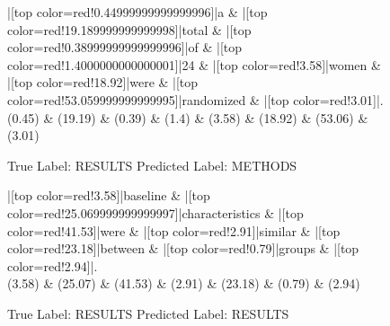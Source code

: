 \documentclass[a4paper, landscape]{article}
\begin{document}
\begin{figure}
\begin{center}
\begin{dependency}
\begin{deptext}
|[top color=red!0.44999999999999996]|a \& |[top color=red!19.189999999999998]|total \& |[top color=red!0.38999999999999996]|of \& |[top color=red!1.4000000000000001]|24 \& |[top color=red!3.58]|women \& |[top color=red!18.92]|were \& |[top color=red!53.059999999999995]|randomized \& |[top color=red!3.01]|.\\
(0.45) \& (19.19) \& (0.39) \& (1.4) \& (3.58) \& (18.92) \& (53.06) \& (3.01)\\
\end{deptext}
\end{dependency}
\end{center}
\caption{True Label: RESULTS Predicted Label: METHODS}
\end{figure}
\clearpage
\begin{figure}
\begin{center}
\begin{dependency}
\begin{deptext}
|[top color=red!3.58]|baseline \& |[top color=red!25.069999999999997]|characteristics \& |[top color=red!41.53]|were \& |[top color=red!2.91]|similar \& |[top color=red!23.18]|between \& |[top color=red!0.79]|groups \& |[top color=red!2.94]|.\\
(3.58) \& (25.07) \& (41.53) \& (2.91) \& (23.18) \& (0.79) \& (2.94)\\
\end{deptext}
\end{dependency}
\end{center}
\caption{True Label: RESULTS Predicted Label: RESULTS}
\end{figure}
\clearpage
\end{document}
